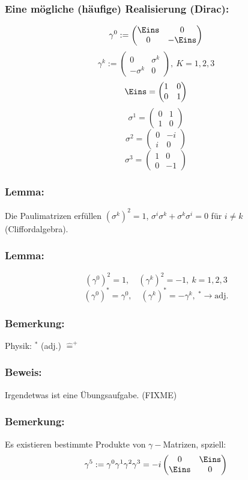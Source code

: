 \documentclass[twoside,a4paper]{scrartcl}
\renewcommand{\1}{\mathds{1}}
\newcommand{\ra}{\rightarrow}
\newcommand{\entspricht}{\mathrel{\widehat{=}}}
\begin{document}
\subsubsection*{Eine mögliche (häufige) Realisierung (Dirac):}
$$\gamma^0:=\begin{pmatrix} \Eins & 0 \\ 0 & -\Eins \end{pmatrix}$$
$$\gamma^k:=\begin{pmatrix} 0 & \sigma^k \\ -\sigma^k & 0 \end{pmatrix}, \ K=1,2,3$$
$$\Eins=\begin{pmatrix} 1 & 0 \\ 0 & 1 \end{pmatrix}$$
$$\sigma^1=\begin{pmatrix} 0 & 1 \\ 1 & 0 \end{pmatrix}$$
$$\sigma^2=\begin{pmatrix} 0 & -i \\ i & 0 \end{pmatrix}$$
$$\sigma^3=\begin{pmatrix} 1 & 0 \\ 0 & -1 \end{pmatrix}$$
\subsubsection*{Lemma:}
Die Paulimatrizen erfüllen $(\sigma^k)^2=1$, $\sigma^i\sigma^k+\sigma^k\sigma^i=0$ für $i\neq k$ (Cliffordalgebra).
\subsubsection*{Lemma:}
$$(\gamma^0)^2=1, \quad (\gamma^k)^2=-1, \ k=1,2,3$$
$$(\gamma^0)^*=\gamma^0, \quad (\gamma^k)^*=-\gamma^k, \ ^*\ra \mathrm{adj.}$$
\subsubsection*{Bemerkung:}
Physik: $^*$ (adj.) $\entspricht ^+$
\subsubsection*{Beweis:}
Irgendetwas ist eine Übungsaufgabe. (FIXME)
\subsubsection*{Bemerkung:}
Es existieren bestimmte Produkte von $\gamma-$Matrizen, spziell:
$$\gamma^5:=\gamma^0\gamma^1\gamma^2\gamma^3=-i \begin{pmatrix} 0 & \Eins \\ \Eins & 0 \end{pmatrix}$$
\end{document}
